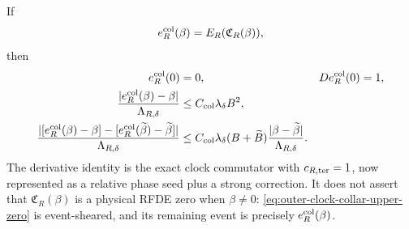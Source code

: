 \begin{lemma}
If
\begin{equation}
 e_R^{\rm col}(\beta)=E_R(\mathfrak C_R(\beta)), \label{eq:outer-clock-collar-event}
\end{equation}
then
\begin{align}
 e_R^{\rm col}(0)&=0,&D e_R^{\rm col}(0)&=1,\notag\\
 \frac{|e_R^{\rm col}(\beta)-\beta|}
      {\Lambda_{R,\delta}}
 &\le C_{\rm col}\lambda_\delta B^2,\notag\\
 \frac{|[e_R^{\rm col}(\beta)-\beta]
       -[e_R^{\rm col}(\widetilde\beta)-\widetilde\beta]|}
       {\Lambda_{R,\delta}}
 &\le C_{\rm col}\lambda_\delta(B+\widetilde B)
       \frac{|\beta-\widetilde\beta|}
            {\Lambda_{R,\delta}}.               \label{eq:outer-clock-collar-event-two-point}
\end{align}
The derivative identity is the exact clock commutator with
\(c_{R,\rm ter}=1\), now represented as a relative phase seed plus a
strong correction.  It does not assert that
\(\mathfrak C_R(\beta)\) is a physical RFDE zero when \(\beta\ne0\):
\cref{eq:outer-clock-collar-upper-zero} is event-sheared, and its
remaining event is precisely \(e_R^{\rm col}(\beta)\).
\end{lemma}

